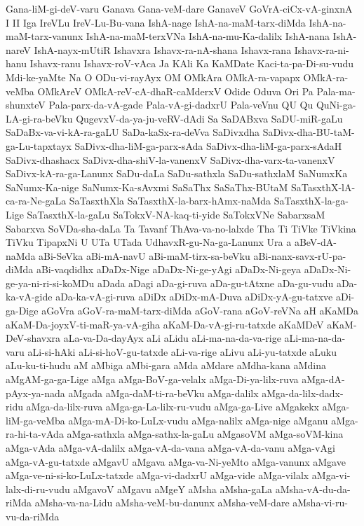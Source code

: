 {Gana-liM-gi-deV-varu
Ganava
Gana-veM-dare
GanaveV
GoVrA-ciCx-vA-ginxnA
I
II
Iga
IreVLu
IreV-Lu-Bu-vana
IshA-nage
IshA-na-maM-tarx-diMda
IshA-na-maM-tarx-vanunx
IshA-na-maM-terxVNa
IshA-na-mu-Ka-dalilx
IshA-nana
IshA-nareV
IshA-nayx-mUtiR
Ishavxra
Ishavx-ra-nA-shana
Ishavx-rana
Ishavx-ra-ni-hanu
Ishavx-ranu
Ishavx-roV-vAca
Ja
KAli
Ka
KaMDate
Kaci-ta-pa-Di-su-vudu
Mdi-ke-yaMte
Na
O
ODu-vi-rayAyx
OM
OMkAra
OMkA-ra-vapapx
OMkA-ra-veMba
OMkAreV
OMkA-reV-cA-dhaR-caMderxV
Odide
Oduva
Ori
Pa
Pala-ma-shunxteV
Pala-parx-da-vA-gade
Pala-vA-gi-dadxrU
Pala-veVnu
QU
Qu
QuNi-ga-LA-gi-ra-beVku
QugevxV-da-ya-ju-veRV-dAdi
Sa
SaDABxva
SaDU-miR-gaLu
SaDaBx-va-vi-kA-ra-gaLU
SaDa-kaSx-ra-deVva
SaDivxdha
SaDivx-dha-BU-taM-ga-Lu-tapxtayx
SaDivx-dha-liM-ga-parx-sAda
SaDivx-dha-liM-ga-parx-sAdaH
SaDivx-dhashacx
SaDivx-dha-shiV-la-vanenxV
SaDivx-dha-varx-ta-vanenxV
SaDivx-kA-ra-ga-Lanunx
SaDu-daLa
SaDu-sathxla
SaDu-sathxlaM
SaNumxKa
SaNumx-Ka-nige
SaNumx-Ka-sAvxmi
SaSaThx
SaSaThx-BUtaM
SaTasxthX-lA-ca-ra-Ne-gaLa
SaTasxthXla
SaTasxthX-la-barx-hAmx-naMda
SaTasxthX-la-ga-Lige
SaTasxthX-la-gaLu
SaTokxV-NA-kaq-ti-yide
SaTokxVNe
SabarxsaM
Sabarxva
SoVDa-sha-daLa
Ta
Tavanf
ThAva-va-no-lalxde
Tha
Ti
TiVke
TiVkina
TiVku
TipapxNi
U
UTa
UTada
UdhavxR-gu-Na-ga-Lanunx
Ura
a
aBeV-dA-naMda
aBi-SeVka
aBi-mA-navU
aBi-maM-tirx-sa-beVku
aBi-nanx-savx-rU-pa-diMda
aBi-vaqdidhx
aDaDx-Nige
aDaDx-Ni-ge-yAgi
aDaDx-Ni-geya
aDaDx-Ni-ge-ya-ni-ri-si-koMDu
aDada
aDagi
aDa-gi-ruva
aDa-gu-tAtxne
aDa-gu-vudu
aDa-ka-vA-gide
aDa-ka-vA-gi-ruva
aDiDx
aDiDx-mA-Duva
aDiDx-yA-gu-tatxve
aDi-ga-Dige
aGoVra
aGoV-ra-maM-tarx-diMda
aGoV-rana
aGoV-reVNa
aH
aKaMDa
aKaM-Da-joyxV-ti-maR-ya-vA-giha
aKaM-Da-vA-gi-ru-tatxde
aKaMDeV
aKaM-DeV-shavxra
aLa-va-Da-dayAyx
aLi
aLidu
aLi-ma-na-da-va-rige
aLi-ma-na-da-varu
aLi-si-hAki
aLi-si-hoV-gu-tatxde
aLi-va-rige
aLivu
aLi-yu-tatxde
aLuku
aLu-ku-ti-hudu
aM
aMbiga
aMbi-gara
aMda
aMdare
aMdha-kana
aMdina
aMgAM-ga-ga-Lige
aMga
aMga-BoV-ga-velalx
aMga-Di-ya-lilx-ruva
aMga-dA-pAyx-ya-nada
aMgada
aMga-daM-ti-ra-beVku
aMga-dalilx
aMga-da-lilx-dadx-ridu
aMga-da-lilx-ruva
aMga-ga-La-lilx-ru-vudu
aMga-ga-Live
aMgakekx
aMga-liM-ga-veMba
aMga-mA-Di-ko-LuLx-vudu
aMga-nalilx
aMga-nige
aMganu
aMga-ra-hi-ta-vAda
aMga-sathxla
aMga-sathx-la-gaLu
aMgasoVM
aMga-soVM-kina
aMga-vAda
aMga-vA-dalilx
aMga-vA-da-vana
aMga-vA-da-vanu
aMga-vAgi
aMga-vA-gu-tatxde
aMgavU
aMgava
aMga-va-Ni-yeMto
aMga-vanunx
aMgave
aMga-ve-ni-si-ko-LuLx-tatxde
aMga-vi-dadxrU
aMga-vide
aMga-vilalx
aMga-vi-lalx-di-ru-vudu
aMgavoV
aMgavu
aMgeY
aMsha
aMsha-gaLa
aMsha-vA-du-da-riMda
aMsha-va-na-Lidu
aMsha-veM-bu-danunx
aMsha-veM-dare
aMsha-vi-ru-vu-da-riMda
}
